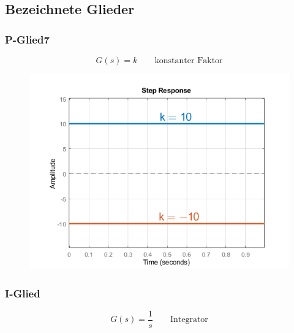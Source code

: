 \documentclass[
  10pt,
  a4paper,
]{article}
\numberwithin{equation}{section}
\begin{document}
\begin{multicols}{2}
\hypertarget{bezeichnete-glieder}{%
\subsection{Bezeichnete Glieder}\label{bezeichnete-glieder}}

\hypertarget{p-glied7}{%
\subsubsection{P-Glied7}\label{p-glied7}}

\[
G(s)=k\qquad \text{konstanter Faktor}
\]

\begin{figure}[H]

{\centering \includegraphics{images/paste-23.png}

}

\end{figure}

\hypertarget{i-glied}{%
\subsubsection{I-Glied}\label{i-glied}}

\[
G(s)=\frac1{s}\qquad\text{Integrator}
\]

\begin{figure}[H]


\end{figure}
\end{multicols}
\end{document}
